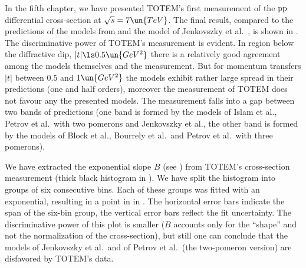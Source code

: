 In the fifth chapter, we have presented TOTEM's first measurement of the $\rm pp$ differential cross-section at $\sqrt s = 7\un{TeV}$. The final result, compared to the predictions of the models from  and the model of Jenkovszky et al.~, is shown in . The discriminative power of TOTEM's measurement is evident. In region below the diffractive dip, $|t| \ls 0.5\un{GeV^2}$ there is a relatively good agreement among the models themselves and the measurement. But for momentum transfers $|t|$ between $0.5$ and $1\un{GeV^2}$ the models exhibit rather large spread in their predictions (one and half orders), moreover the measurement of TOTEM does not favour any the presented models. The measurement falls into a gap between two bands of predictions (one band is formed by the models of Islam et al., Petrov et al.~with two pomerons and Jenkovszky et al., the other band is formed by the models of Block et al., Bourrely et al.~and Petrov et al.~with three pomerons).


We have extracted the exponential slope $B$ (see ) from TOTEM's cross-section measurement (thick black histogram in ). We have split the histogram into groups of six consecutive bins. Each of these groups was fitted with an exponential, resulting in a point in in . The horizontal error bars indicate the span of the six-bin group, the vertical error bars reflect the fit uncertainty. The discriminative power of this plot is smaller ($B$ accounts only for the ``shape'' and not the normalization of the cross-section), but still one can conclude that the models of Jenkovszky et al.~and of Petrov et al.~(the two-pomeron version) are disfavored by TOTEM's data.


